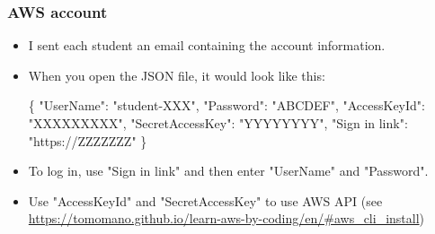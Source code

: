 \documentclass[unicode,11pt]{beamer}
\begin{document}
\begin{frame}[fragile]
\frametitle{AWS account}
\begin{itemize}
    \item I sent each student an email containing the account information.
    \item When you open the JSON file, it would look like this:
    \begin{semiverbatim}
    \{
        "UserName": "student-XXX",
        "Password": "ABCDEF",
        "AccessKeyId": "XXXXXXXXX",
        "SecretAccessKey": "YYYYYYYY",
        "Sign in link": "https://ZZZZZZZ"
    \}
    \end{semiverbatim}
    \item To log in, use "Sign in link" and then enter "UserName" and "Password".
    \item Use "AccessKeyId" and "SecretAccessKey" to use AWS API (see \url{https://tomomano.github.io/learn-aws-by-coding/en/#aws_cli_install})

\end{itemize}

\end{frame}
\end{document}
